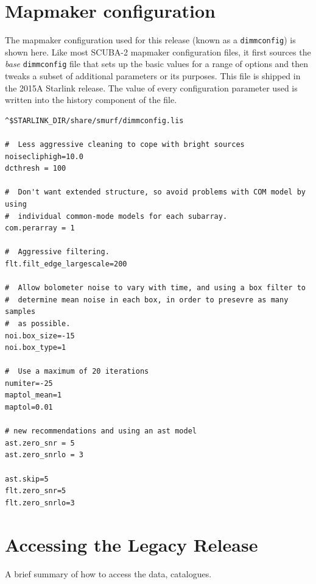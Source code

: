 \documentclass[twocolumn]{aastex6}
\begin{document}
\appendix


\section{Mapmaker configuration}
\label{app:config}
The mapmaker configuration used for this release (known as a
\texttt{dimmconfig}) is shown here. Like most SCUBA-2 mapmaker
configuration files, it first sources the \emph{base}
\texttt{dimmconfig} file that sets up the basic values for a range of
options and then tweaks a subset of additional parameters or its
purposes. This file is shipped in the 2015A Starlink release. The
value of every configuration parameter used is written into the
history component of the file.

\begin{verbatim}
^$STARLINK_DIR/share/smurf/dimmconfig.lis

#  Less aggressive cleaning to cope with bright sources
noisecliphigh=10.0
dcthresh = 100

#  Don't want extended structure, so avoid problems with COM model by using
#  individual common-mode models for each subarray.
com.perarray = 1

#  Aggressive filtering.
flt.filt_edge_largescale=200

#  Allow bolometer noise to vary with time, and using a box filter to
#  determine mean noise in each box, in order to presevre as many samples
#  as possible.
noi.box_size=-15
noi.box_type=1

#  Use a maximum of 20 iterations
numiter=-25
maptol_mean=1
maptol=0.01

# new recommendations and using an ast model
ast.zero_snr = 5
ast.zero_snrlo = 3

ast.skip=5
flt.zero_snr=5
flt.zero_snrlo=3
\end{verbatim}

\section{Accessing the Legacy Release}
A brief summary of how to access the data, catalogues.



\end{document}
